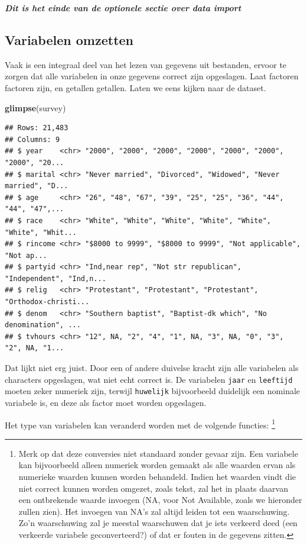 \documentclass[]{tufte-book}
\newenvironment{Shaded}{}{}
\newcommand{\KeywordTok}[1]{\textcolor[rgb]{0.00,0.44,0.13}{\textbf{#1}}}
\newcommand{\NormalTok}[1]{#1}
\begin{document}
\emph{\textbf{Dit is het einde van de optionele sectie over data import}}

\hypertarget{variabelen-omzetten}{%
\subsection{Variabelen omzetten}\label{variabelen-omzetten}}

Vaak is een integraal deel van het lezen van gegevens uit bestanden, ervoor te zorgen dat alle variabelen in onze gegevens correct zijn opgeslagen. Laat factoren factoren zijn, en getallen getallen. Laten we eens kijken naar de dataset.

\begin{Shaded}
\begin{Highlighting}[]
\KeywordTok{glimpse}\NormalTok{(survey)}
\end{Highlighting}
\end{Shaded}

\begin{verbatim}
## Rows: 21,483
## Columns: 9
## $ year    <chr> "2000", "2000", "2000", "2000", "2000", "2000", "2000", "20...
## $ marital <chr> "Never married", "Divorced", "Widowed", "Never married", "D...
## $ age     <chr> "26", "48", "67", "39", "25", "25", "36", "44", "44", "47",...
## $ race    <chr> "White", "White", "White", "White", "White", "White", "Whit...
## $ rincome <chr> "$8000 to 9999", "$8000 to 9999", "Not applicable", "Not ap...
## $ partyid <chr> "Ind,near rep", "Not str republican", "Independent", "Ind,n...
## $ relig   <chr> "Protestant", "Protestant", "Protestant", "Orthodox-christi...
## $ denom   <chr> "Southern baptist", "Baptist-dk which", "No denomination", ...
## $ tvhours <chr> "12", NA, "2", "4", "1", NA, "3", NA, "0", "3", "2", NA, "1...
\end{verbatim}

Dat lijkt niet erg juist. Door een of andere duivelse kracht zijn alle variabelen als characters opgeslagen, wat niet echt correct is. De variabelen \texttt{jaar} en \texttt{leeftijd} moeten zeker numeriek zijn, terwijl \texttt{huwelijk} bijvoorbeeld duidelijk een nominale variabele is, en deze als factor moet worden opgeslagen.

Het type van variabelen kan veranderd worden met de volgende functies: \footnote{Merk op dat deze conversies niet standaard zonder gevaar zijn. Een variabele kan bijvoorbeeld alleen numeriek worden gemaakt als alle waarden ervan als numerieke waarden kunnen worden behandeld. Indien het waarden vindt die niet correct kunnen worden omgezet, zoals tekst, zal het in plaats daarvan een ontbrekende waarde invoegen (NA, voor Not Available, zoals we hieronder zullen zien). Het invoegen van NA's zal altijd leiden tot een waarschuwing. Zo'n waarschuwing zal je meestal waarschuwen dat je iets verkeerd deed (een verkeerde variabele geconverteerd?) of dat er fouten in de gegevens zitten.}
\end{document}
